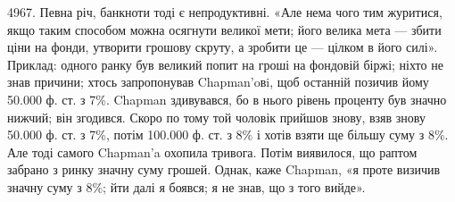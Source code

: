 4967. Певна річ, банкноти тоді є непродуктивні. «Але нема чого тим
журитися, якщо таким способом можна осягнути великої мети; його велика
мета — збити ціни на фонди, утворити грошову скруту, а зробити це — цілком
в його силі». Приклад: одного ранку був великий попит на гроші на фондовій
біржі; ніхто не знав причини; хтось запропонував Chapman’oвi, щоб останній
позичив йому \num{50.000} ф. ст. з 7\%. Chapman здивувався, бо в нього рівень
проценту був значно нижчий; він згодився. Скоро по тому той чоловік прийшов
знову, взяв знову \num{50.000} ф. ст. з 7\%, потім \num{100.000} ф. ст. з 8\% і хотів
взяти ще більшу суму з 8\%. Але тоді самого Chapman’a охопила тривога.
Потім виявилося, що раптом забрано з ринку значну суму грошей. Однак, каже
Chapman, «я проте визичив значну суму з 8\%; йти далі я боявся; я не знав,
що з того вийде».
